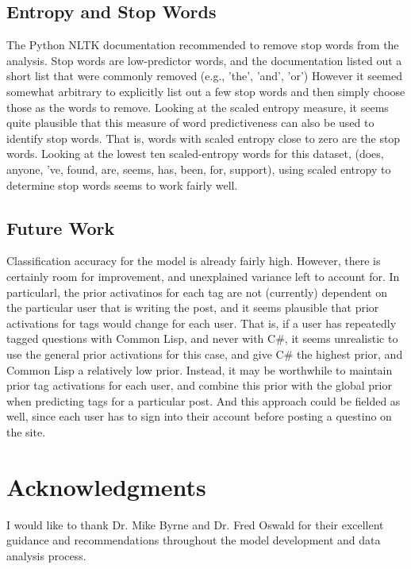 \documentclass[10pt,letterpaper]{article}
\begin{document}
\subsection{Entropy and Stop Words}

The Python NLTK documentation \cite{Bird2009} recommended to remove stop words from the analysis.
Stop words are low-predictor words, and the documentation listed out a short list that were commonly removed (e.g., 'the', 'and', 'or')
However it seemed somewhat arbitrary to explicitly list out a few stop words and then simply choose those as the words to remove.
Looking at the scaled entropy measure, it seems quite plausible that this measure of word predictiveness can also be used to identify stop words.
That is, words with scaled entropy close to zero are the stop words.
Looking at the lowest ten scaled-entropy words for this dataset, (does, anyone, 've, found, are, seems, has, been, for, support), using scaled entropy to determine stop words seems to work fairly well.

\subsection{Future Work}

Classification accuracy for the model is already fairly high.
However, there is certainly room for improvement, and unexplained variance left to account for.
In particularl, the prior activatinos for each tag are not (currently) dependent on the particular user that is writing the post, and it seems plausible that prior activations for tags would change for each user.
That is, if a user has repeatedly tagged questions with Common Lisp, and never with C\#, it seems unrealistic to use the general prior activations for this case, and give C\# the highest prior, and Common Lisp a relatively low prior.
Instead, it may be worthwhile to maintain prior tag activations for each user, and combine this prior with the global prior when predicting tags for a particular post.
And this approach could be fielded as well, since each user has to sign into their account before posting a questino on the site.

\section{Acknowledgments}

I would like to thank Dr. Mike Byrne and Dr. Fred Oswald for their excellent guidance and recommendations throughout the model development and data analysis process.


\setlength{\bibleftmargin}{.125in}
\setlength{\bibindent}{-\bibleftmargin}

\end{document}

